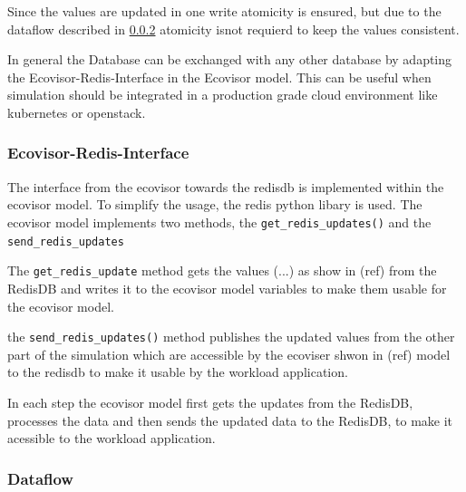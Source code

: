 Since the values are updated in one write atomicity is ensured, but due to the dataflow described in \ref{subsec:dataflow}
atomicity isnot requierd to keep the values consistent.

In general the Database can be exchanged with any other database by adapting the Ecovisor-Redis-Interface in the Ecovisor model. This can be useful when simulation should be integrated
in a production grade cloud environment like kubernetes or openstack.


\subsubsection{Ecovisor-Redis-Interface}
The interface from the ecovisor towards the redisdb is implemented within the ecovisor model. To simplify the usage, the redis python libary %
is used. The ecovisor model implements two methods, the
\texttt{get\_redis\_updates()} and the \texttt{send\_redis\_updates} %

The \texttt{get\_redis\_update} method gets the values (...) as show in (ref) from the RedisDB %
and writes it to the ecovisor model variables to make them usable for the ecovisor model.

the \texttt{send\_redis\_updates()} method publishes the updated values from the other part of the simulation which are accessible by the ecoviser shwon in (ref) model to the redisdb to make it
usable by the workload application. %

In each step the ecovisor model first gets the updates from the RedisDB, processes the data and then sends the updated data to the RedisDB, to make it
acessible to the workload application.

\subsubsection{Dataflow}
\label{subsec:dataflow}

